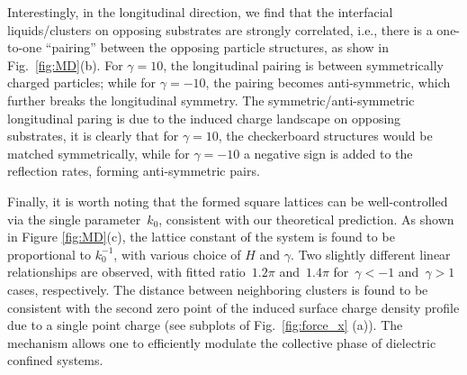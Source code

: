 Interestingly, in the longitudinal direction, we find that the interfacial liquids/clusters on opposing substrates are strongly correlated, i.e., there is a one-to-one “pairing” between the opposing particle structures, as show in Fig.~\ref{fig:MD}(b).
For $\gamma=10$, the longitudinal pairing is between symmetrically charged particles; while for $\gamma=-10$, the pairing becomes anti-symmetric, which further breaks the longitudinal symmetry. The symmetric/anti-symmetric longitudinal paring is due to the induced charge landscape on opposing substrates, it is clearly that for $\gamma=10$, the checkerboard structures would be matched symmetrically, while for $\gamma=-10$ a negative sign is added to the reflection rates, forming anti-symmetric pairs.

Finally, it is worth noting that the formed square lattices can be well-controlled via the single parameter~$k_0$, consistent with our theoretical prediction.
As shown in Figure \ref{fig:MD}(c), the lattice constant of the system is found to be proportional to $k_0^{-1}$, with various choice of $H$ and $\gamma$. 
Two slightly different linear relationships are observed, with fitted ratio~$1.2 \pi$ and~$1.4 \pi$ for~$\gamma < -1$ and~$\gamma > 1$ cases, respectively. 
The distance between neighboring clusters is found to be consistent with the second zero point of the induced surface charge density profile due to a single point charge (see subplots of Fig.~\ref{fig:force_x} (a)). The mechanism allows one to efficiently modulate the collective phase of dielectric confined systems.